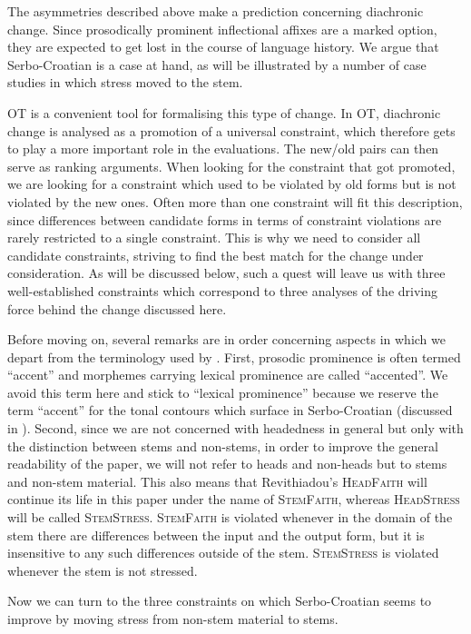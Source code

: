 \documentclass[output=paper,modfonts,nonflat
]{langsci/langscibook}
\begin{document}
The asymmetries described above make a prediction concerning diachronic change. Since prosodically prominent inflectional affixes are a marked option, they are expected to get lost in the course of language history. We argue that Serbo-Croatian is a case at hand, as will be illustrated by a number of case studies in which stress moved to the stem.

OT is a convenient tool for formalising this type of change. In OT, diachronic change is analysed as a promotion of a universal constraint, which therefore gets to play a more important role in the evaluations. The new/old pairs can then serve as ranking arguments. When looking for the constraint that got promoted, we are looking for a constraint which used to be violated by old forms but is not violated by the new ones. Often more than one constraint will fit this description, since differences between candidate forms in terms of constraint violations are rarely restricted to a single constraint. This is why we need to consider all candidate constraints, striving to find the best match for the change under consideration. As will be discussed below, such a quest will leave us with three well-established constraints which correspond to three analyses of the driving force behind the change discussed here. 

Before moving on, several remarks are in order concerning aspects in which we depart from the terminology used by \citet{Revithiadou1999}. First, prosodic prominence is often termed ``accent'' and morphemes carrying lexical prominence are called ``accented''. We avoid this term here and stick to ``lexical prominence'' because we reserve the term ``accent'' for the tonal contours which surface in Serbo-Croatian (discussed in ). Second, since we are not concerned with headedness in general but only with the distinction between stems and non-stems, in order to improve the general readability of the paper, we will not refer to heads and non-heads but to stems and non-stem material. This also means that Revithiadou's \textsc{HeadFaith} will continue its life in this paper under the name of \textsc{StemFaith}, whereas  \textsc{HeadStress} will be called \textsc{StemStress}. \textsc{StemFaith} is violated whenever in the domain of the stem there are differences between the input and the output form, but it is insensitive to any such differences outside of the stem. \textsc{StemStress} is violated whenever the stem is not stressed. 



Now we can turn to the three constraints on which Serbo-Croatian seems to improve by moving stress from non-stem material to stems.
\end{document}

